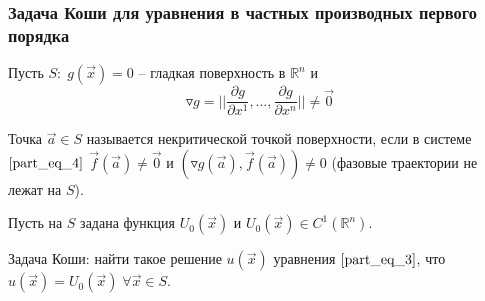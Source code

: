 \documentclass[a4paper, 12pt]{article}
\begin{document}
    \subsubsection{Задача Коши для уравнения в частных производных первого порядка}

    Пусть $S: \; g \left( \overrightarrow{x} \right) = 0$ -- гладкая поверхность в $\mathbb{R}^n$ и 
    \begin{equation*}
        \triangledown g = \bigg| \bigg| \frac{\partial g}{\partial x^{1}}, \dots, \frac{\partial g}{\partial x^{n}} \bigg| \bigg| \neq \overrightarrow{0}
    \end{equation*}

    \begin{definition}
        Точка $\overrightarrow{a} \in S$ называется некритической точкой поверхности, если в системе $\eqref{part_eq_4}$ $\overrightarrow{f} \left( \overrightarrow{a} \right) \neq \overrightarrow{0}$ и $ \left( \triangledown g \left( \overrightarrow{a} \right), \overrightarrow{f} \left( \overrightarrow{a} \right) \right) \neq 0$  (фазовые траектории не лежат на $S$).
    \end{definition}

    Пусть на $S$ задана функция $U_0 \left( \overrightarrow{x} \right)$ и $U_0 \left( \overrightarrow{x} \right) \in C^1 \left( \mathbb{R}^n \right)$.

    Задача Коши: найти такое решение $u \left( \overrightarrow{x} \right)$ уравнения $\eqref{part_eq_3}$, что $u \left( \overrightarrow{x} \right) = U_0 \left( \overrightarrow{x} \right) \; \forall \overrightarrow{x} \in S$.
    
\end{document}
